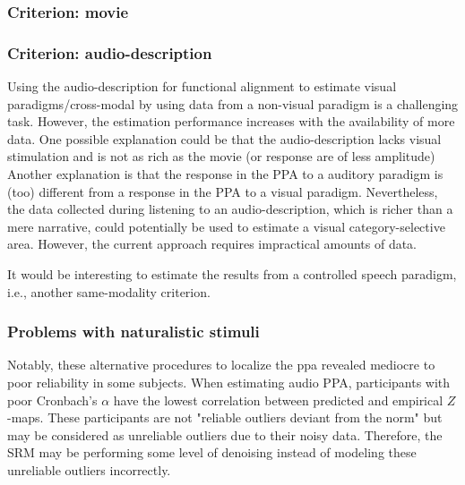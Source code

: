 \subsubsection{Criterion: movie}

\subsubsection{Criterion: audio-description}



%
Using the audio-description for functional alignment to estimate visual
paradigms/cross-modal by using data from a non-visual paradigm is a challenging
task.
%
However, the estimation performance increases with the availability of
more data.
%
One possible explanation could be that the audio-description lacks visual
stimulation and is not as rich as the movie (or response are of less amplitude)
%
Another explanation is that the response in the PPA to a auditory paradigm is
(too) different from a response in the PPA to a visual paradigm.
%
Nevertheless, the data collected during listening to an audio-description, which
is richer than a mere narrative, could potentially be used to estimate a visual
category-selective area. However, the current approach requires impractical
amounts of data.



%
It would be interesting to estimate the results from a controlled speech
paradigm, i.e., another same-modality criterion.

\subsubsection{Problems with naturalistic stimuli}


%
Notably, these alternative procedures to localize the \ac{ppa} revealed mediocre
to poor reliability in some subjects.
%
When estimating audio PPA, participants with poor Cronbach's $\alpha$ have the
lowest correlation between predicted and empirical $Z$-maps.
%
These participants are not "reliable outliers deviant from the norm" but may be
considered as unreliable outliers due to their noisy data.
%
Therefore, the SRM may be performing some level of denoising instead of modeling
these unreliable outliers incorrectly.

